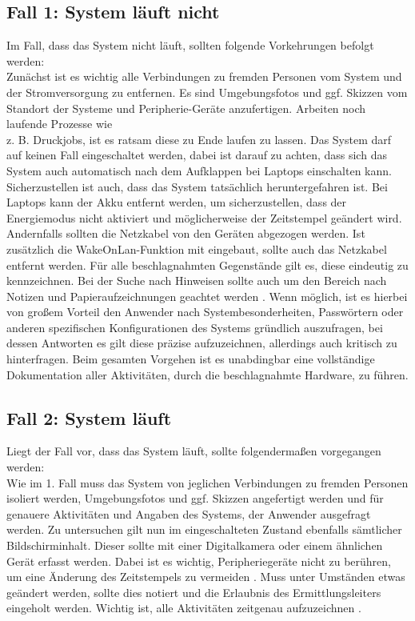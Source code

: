 \documentclass[12pt,DIV=14, version=first, BCOR=10mm,a4paper,twoside,parskip=half-,headsepline,headinclude]{scrartcl}
\begin{document}
	\subsection{Fall 1: System läuft nicht}	 
	Im Fall, dass das System nicht läuft, sollten folgende Vorkehrungen befolgt werden:  \\ 
	Zunächst ist es wichtig alle Verbindungen zu fremden Personen vom System und der Stromversorgung zu entfernen. Es sind Umgebungsfotos und ggf. Skizzen vom Standort der Systeme und Peripherie-Geräte anzufertigen. Arbeiten noch laufende Prozesse  wie \\z. B. Druckjobs, ist es ratsam diese zu Ende laufen zu lassen. Das System darf auf keinen Fall eingeschaltet werden, dabei ist darauf zu achten, dass sich das System auch automatisch nach dem Aufklappen bei Laptops einschalten kann. Sicherzustellen ist auch, dass das System tatsächlich heruntergefahren ist. Bei Laptops kann der Akku entfernt werden, um sicherzustellen, dass der Energiemodus nicht aktiviert und möglicherweise der Zeitstempel geändert wird. Andernfalls sollten die Netzkabel von den Geräten abgezogen werden. Ist zusätzlich die WakeOnLan-Funktion mit eingebaut, sollte auch das Netzkabel entfernt werden. Für  alle beschlagnahmten Gegenstände gilt es, diese eindeutig zu kennzeichnen. Bei der Suche nach Hinweisen sollte auch um den Bereich nach Notizen und Papieraufzeichnungen geachtet werden \cite[vgl. S. 96]{texbook01}. Wenn möglich, ist es hierbei von großem Vorteil den Anwender nach Systembesonderheiten, Passwörtern oder anderen spezifischen Konfigurationen des Systems gründlich auszufragen, bei dessen Antworten es gilt diese präzise aufzuzeichnen, allerdings auch kritisch zu hinterfragen. Beim gesamten Vorgehen ist es unabdingbar eine vollständige Dokumentation aller Aktivitäten, durch die beschlagnahmte Hardware, zu führen.

	\subsection{Fall 2: System läuft}	 
	Liegt der Fall vor, dass das System läuft, sollte folgendermaßen vorgegangen werden:  \\ 
	Wie im 1. Fall muss das System von jeglichen Verbindungen zu fremden Personen isoliert werden, Umgebungsfotos und ggf. Skizzen angefertigt werden und für genauere Aktivitäten und Angaben des Systems, der Anwender ausgefragt werden. Zu untersuchen gilt nun im eingeschalteten Zustand ebenfalls sämtlicher Bildschirminhalt. Dieser sollte mit einer Digitalkamera oder einem ähnlichen Gerät erfasst werden. Dabei ist es wichtig, Peripheriegeräte nicht zu berühren, um eine Änderung des Zeitstempels zu vermeiden \cite[vgl. S. 97]{texbook01}. Muss unter Umständen etwas geändert werden, sollte dies notiert und die Erlaubnis des Ermittlungsleiters eingeholt werden. Wichtig ist, alle Aktivitäten zeitgenau aufzuzeichnen \cite[vgl. S. 53]{BSI_leitfaden}.
\end{document}
